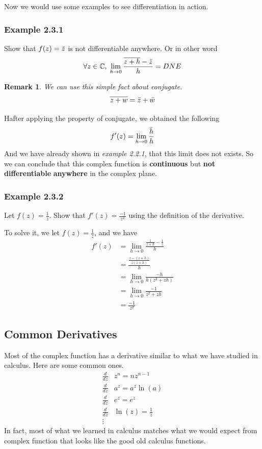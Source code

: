 \documentclass[12pt]{book}
\newcommand{\limto}[1]{\lim_{#1}}
\newcommand{\C}{\mathbb{C}}
\newcommand{\dydx}[2]{\frac{d #1}{d #2}}
\newcommand{\paren}[1]{\left( #1 \right)}
\newtheorem*{remark}{Remark}
\begin{document}
Now we would use some examples to see differentiation in action.
\subsubsection{Example 2.3.1}
Show that $f(z) = \Bar{z}$ is not differentiable anywhere. Or in other word
\[
\forall z \in \C, \; \limto{h \to 0}\frac{\overline{z+h}-\Bar{z}}{h} = DNE
\]
\begin{remark}
We can use this simple fact about conjugate.
    \begin{align}
        \overline{z+w} = \Bar{z}+ \Bar{w}
    \end{align}
\end{remark}
Hafter applying the property of conjugate, we obtained the following
\[
f'(z) = \limto{h \to 0}\frac{\Bar{h}}{h}
\]
And we have already shown in \textit{example 2.2.1}, that this limit does not exists. So we can conclude that this complex function is \textbf{continuous} but \textbf{not differentiable} \textbf{anywhere} in the complex plane. 

\subsubsection{Example 2.3.2}
Let $f(z) = \frac{1}{z}$.  Show that $f'(z) = \frac{-1}{z^{2}}$ using the definition of the derivative.  

To solve it, we let $f(z)=\frac{1}{z}$, and we have
\begin{align*}
    f'(z)   &=\lim_{h\to 0}\frac{\frac{1}{z+h}-\frac{1}{z}}{h}\\
            &=\frac{\frac{z-(z+h)}{z(z+h)}}{h}\\
            &=\lim_{h\to 0}\frac{-h}{h(z^2+zh)}\\
            &=\lim_{h\to 0}\frac{-1}{z^2+zh}\\
            &=\frac{-1}{z^2}
\end{align*}
\subsection{Common Derivatives}
Most of the complex function has a derivative similar to what we have studied in calculus. Here are some common ones.
\begin{align*}
    \dydx{}{z} &z^n = nz^{n-1}\\
    \dydx{}{z} &a^z = a^z\ln\paren{a}\\
    \dydx{}{z} &e^z = e^z\\
    \dydx{}{z} &\ln\paren{z} = \frac{1}{z}\\
    \vdots
\end{align*}
In fact, most of what we learned in calculus matches what we would expect from complex function that looks like the good old calculus functions. 
\end{document}
